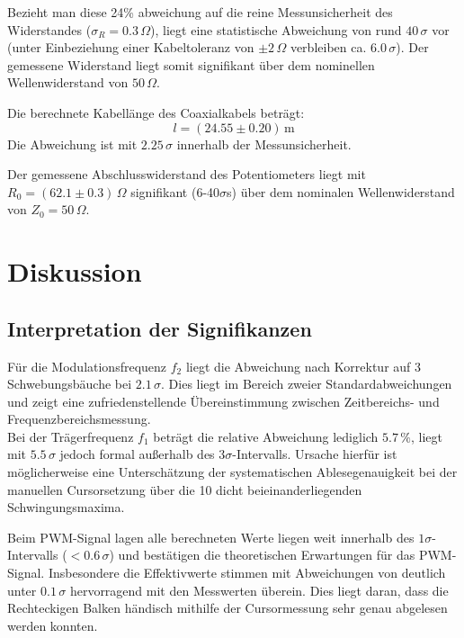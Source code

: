 \documentclass[12pt,a4paper,titlepage]{scrartcl}
\numberwithin{equation}{section}
\numberwithin{table}{section}
\numberwithin{figure}{section}
\begin{document}
Bezieht man diese 24\% abweichung auf die reine Messunsicherheit des Widerstandes ($\sigma_R = 0.3\,\Omega$), liegt eine statistische Abweichung von rund $40\,\sigma$ vor (unter Einbeziehung einer Kabeltoleranz von $\pm 2\,\Omega$ verbleiben ca. $6.0\,\sigma$). Der gemessene Widerstand liegt somit signifikant über dem nominellen Wellenwiderstand von $50\,\Omega$.


\begin{resultbox}
    Die berechnete Kabellänge des Coaxialkabels beträgt:
    \begin{equation*}
        l = (24.55 \pm 0.20)\,\text{m}
    \end{equation*}
    Die Abweichung ist mit $2.25\,\sigma$ innerhalb der Messunsicherheit.

    Der gemessene Abschlusswiderstand des Potentiometers liegt mit $R_0 = (62.1 \pm 0.3)\,\Omega$ signifikant (6-40$\sigma$s) über dem nominalen Wellenwiderstand von $Z_0 = 50\,\Omega$.
\end{resultbox}

\section{Diskussion}
\subsection{Interpretation der Signifikanzen}
Für die Modulationsfrequenz $f_2$ liegt die Abweichung nach Korrektur auf 3 Schwebungsbäuche bei $2.1\,\sigma$. Dies liegt im Bereich zweier Standardabweichungen und zeigt eine zufriedenstellende Übereinstimmung zwischen Zeitbereichs- und Frequenzbereichsmessung.\\
Bei der Trägerfrequenz $f_1$ beträgt die relative Abweichung lediglich $5.7\,\%$, liegt mit $5.5\,\sigma$ jedoch formal außerhalb des $3\sigma$-Intervalls. Ursache hierfür ist möglicherweise eine Unterschätzung der systematischen Ablesegenauigkeit bei der manuellen Cursorsetzung über die 10 dicht beieinanderliegenden Schwingungsmaxima.

Beim PWM-Signal lagen alle berechneten Werte liegen weit innerhalb des $1\sigma$-Intervalls ($< 0.6\,\sigma$) und bestätigen die theoretischen Erwartungen für das PWM-Signal. Insbesondere die Effektivwerte stimmen mit Abweichungen von deutlich unter $0.1\,\sigma$ hervorragend mit den Messwerten überein. Dies liegt daran, dass die Rechteckigen Balken händisch mithilfe der Cursormessung sehr genau abgelesen werden konnten.
\end{document}
